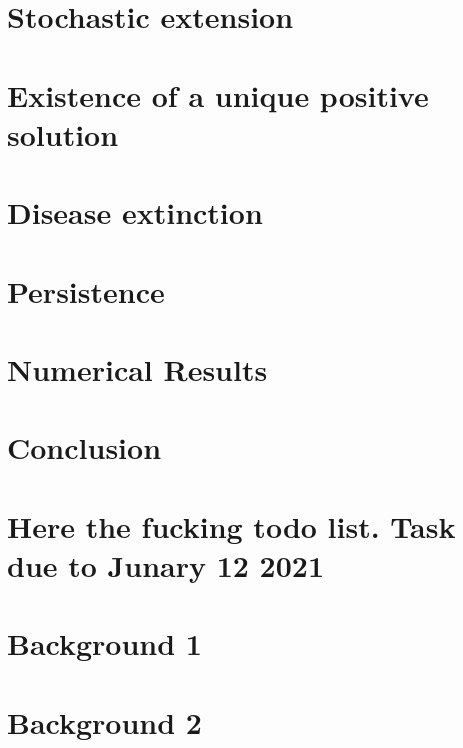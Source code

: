 \documentclass[smallextended]{svjour3}
\begin{document}
	\section{Stochastic extension}
		
	\section{Existence of a unique positive solution}
		\label{sec:solution_existence}
		
	\section{Disease extinction}
		\label{extinction}
		
	\section{Persistence}
		\label{sec:persistence}
		
		
	\section{Numerical Results}
		\label{sec:numerics}
		
	\section{Conclusion}
		\label{sec:conclusion}
	 
	\section{Here the fucking todo list. Task due to Junary 12 2021}
	\listoftodos
	\appendix
	\section{Background 1}
	
	\label{app::A}
	\section{Background 2}
	
	\label{app::B}
	{}
    
\end{document}
